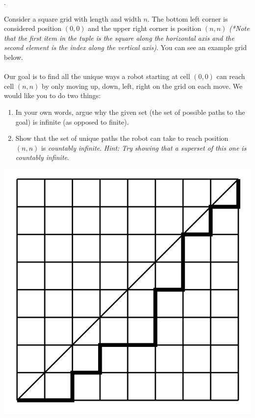 \documentclass[12pt]{article}
\newcounter{quesnum}
\newcommand{\question}[2][??]{
\begin{list}{\labelitemi}{\leftmargin=2em}
\item [\arabic{quesnum}.] {} {#2}
\end{list}
\addtocounter{quesnum}{1}
}
\begin{document}
\question[3]{
Consider a square grid with length and width $n$. The bottom left corner is considered position $(0,0)$ and the upper right corner is position $(n,n)$ \emph{(*Note that the first item in the tuple is the square along the horizontal axis and the second element is the index along the vertical axis)}. You can see an example grid below.\\
\\
Our goal is to find all the unique ways a robot starting at cell $(0,0)$ can reach cell $(n,n)$ by only moving up, down, left, right on the grid on each move. We would like you to do two things:

\begin{enumerate}
	\item In your own words, argue why the given set (the set of possible paths to the goal) is infinite (as opposed to finite).
	\item Show that the set of unique paths the robot can take to reach position $(n,n)$ is \emph{countably infinite}. \emph{Hint: Try showing that a superset of this one is countably infinite}.
\end{enumerate}
}

\includegraphics[scale=0.4]{img/lattice}

\vspace{12pt}
\end{document}
